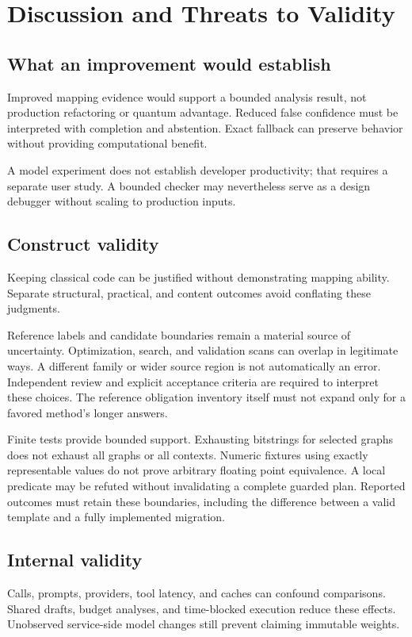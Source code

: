\section{Discussion and Threats to Validity}
\subsection{What an improvement would establish}
Improved mapping evidence would support a bounded analysis result, not production
refactoring or quantum advantage. Reduced false confidence must be interpreted
with completion and abstention. Exact fallback can preserve behavior without
providing computational benefit.

A model experiment does not establish developer productivity; that requires a
separate user study. A bounded checker may nevertheless serve as a design debugger
without scaling to production inputs.

\subsection{Construct validity}
Keeping classical code can be justified without demonstrating mapping ability.
Separate structural, practical, and content outcomes avoid conflating these judgments.

Reference labels and candidate boundaries remain a material source of uncertainty.
Optimization, search, and validation scans can overlap in legitimate ways. A
different family or wider source region is not automatically an error. Independent
review and explicit acceptance criteria are required to interpret these choices.
The reference obligation inventory itself must not expand only for a favored
method's longer answers.

Finite tests provide bounded support. Exhausting bitstrings for selected graphs
does not exhaust all graphs or all contexts. Numeric fixtures using exactly
representable values do not prove arbitrary floating point equivalence. A local
predicate may be refuted without invalidating a complete guarded plan. Reported
outcomes must retain these boundaries, including the difference between a valid
template and a fully implemented migration.

\subsection{Internal validity}
Calls, prompts, providers, tool latency, and caches can confound comparisons.
Shared drafts, budget analyses, and time-blocked execution reduce these effects.
Unobserved service-side model changes still prevent claiming immutable weights.

